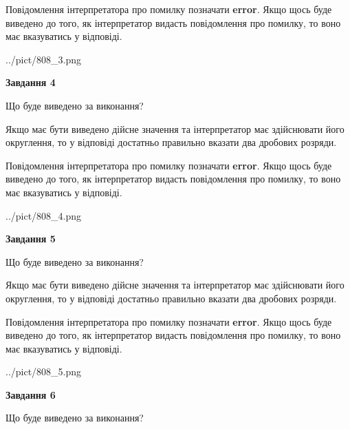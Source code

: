 \documentclass[12pt, ukrainian]{article}
\begin{document}
{\begin {Large}
Повідомлення інтерпретатора про помилку позначати \textbf{error}.
Якщо щось буде виведено до того, як інтерпретатор видасть повідомлення про помилку, 
то воно має вказуватись у відповіді. \par

\begin{center}
	{../pict/808_3.png}
\end{center}
\newpage

{\begin {center}\textbf{Завдання 4}\end {center}}\par
Що буде виведено за виконання? \par

Якщо має бути виведено дійсне значення та інтерпретатор має здійснювати його округлення, 
то у відповіді достатньо правильно вказати два дробових розряди.

Повідомлення інтерпретатора про помилку позначати \textbf{error}.
Якщо щось буде виведено до того, як інтерпретатор видасть повідомлення про помилку, 
то воно має вказуватись у відповіді. \par

\begin{center}
	{../pict/808_4.png}
\end{center}
\newpage

{\begin {center}\textbf{Завдання 5}\end {center}}\par
Що буде виведено за виконання? \par

Якщо має бути виведено дійсне значення та інтерпретатор має здійснювати його округлення, 
то у відповіді достатньо правильно вказати два дробових розряди.

Повідомлення інтерпретатора про помилку позначати \textbf{error}.
Якщо щось буде виведено до того, як інтерпретатор видасть повідомлення про помилку, 
то воно має вказуватись у відповіді. \par

\begin{center}
	{../pict/808_5.png}
\end{center}
\newpage

{\begin {center}\textbf{Завдання 6}\end {center}}\par
Що буде виведено за виконання? \par


\end{Large}}
\end{document}
